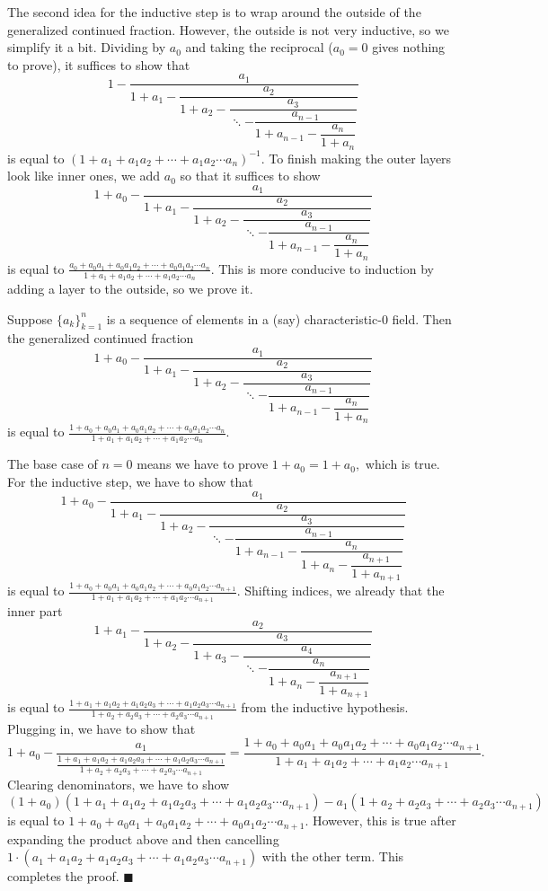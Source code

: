 The second idea for the inductive step is to wrap around the outside of the generalized continued fraction. However, the outside is not very inductive, so we simplify it a bit. Dividing by $a_0$ and taking the reciprocal ($a_0=0$ gives nothing to prove), it suffices to show that
\[1-\dfrac{a_1}{1+a_1-\dfrac{a_2}{1+a_2-\dfrac{a_3}{\ddots-\dfrac{a_{n-1}}{1+a_{n-1}-\dfrac{a_n}{1+a_n}}}}}\]
is equal to $(1+a_1+a_1a_2+\cdots+a_1a_2\cdots a_n)^{-1}.$ To finish making the outer layers look like inner ones, we add $a_0$ so that it suffices to show
\[1+a_0-\dfrac{a_1}{1+a_1-\dfrac{a_2}{1+a_2-\dfrac{a_3}{\ddots-\dfrac{a_{n-1}}{1+a_{n-1}-\dfrac{a_n}{1+a_n}}}}}\]
is equal to $\frac{a_0+a_0a_1+a_0a_1a_2+\cdots+a_0a_1a_2\cdots a_n}{1+a_1+a_1a_2+\cdots+a_1a_2\cdots a_n}.$ This is more conducive to induction by adding a layer to the outside, so we prove it.
\begin{lemma}
    Suppose $\{a_k\}_{k=1}^n$ is a sequence of elements in a (say) characteristic-$0$ field. Then the generalized continued fraction
    \[1+a_0-\dfrac{a_1}{1+a_1-\dfrac{a_2}{1+a_2-\dfrac{a_3}{\ddots-\dfrac{a_{n-1}}{1+a_{n-1}-\dfrac{a_n}{1+a_n}}}}}\]
    is equal to $\frac{1+a_0+a_0a_1+a_0a_1a_2+\cdots+a_0a_1a_2\cdots a_n}{1+a_1+a_1a_2+\cdots+a_1a_2\cdots a_n}.$
\end{lemma}
The base case of $n=0$ means we have to prove $1+a_0=1+a_0,$ which is true. For the inductive step, we have to show that
\[1+a_0-\dfrac{a_1}{1+a_1-\dfrac{a_2}{1+a_2-\dfrac{a_3}{\ddots-\dfrac{a_{n-1}}{1+a_{n-1}-\dfrac{a_n}{1+a_n-\dfrac{a_{n+1}}{1+a_{n+1}}}}}}}\]
is equal to $\frac{1+a_0+a_0a_1+a_0a_1a_2+\cdots+a_0a_1a_2\cdots a_{n+1}}{1+a_1+a_1a_2+\cdots+a_1a_2\cdots a_{n+1}}.$ Shifting indices, we already that the inner part
\[1+a_1-\dfrac{a_2}{1+a_2-\dfrac{a_3}{1+a_3-\dfrac{a_4}{\ddots-\dfrac{a_n}{1+a_n-\dfrac{a_{n+1}}{1+a_{n+1}}}}}}\]
is equal to $\frac{1+a_1+a_1a_2+a_1a_2a_3+\cdots+a_1a_2a_3\cdots a_{n+1}}{1+a_2+a_2a_3+\cdots+a_2a_3\cdots a_{n+1}}$ from the inductive hypothesis. Plugging in, we have to show that
\[1+a_0-\dfrac{a_1}{\frac{1+a_1+a_1a_2+a_1a_2a_3+\cdots+a_1a_2a_3\cdots a_{n+1}}{1+a_2+a_2a_3+\cdots+a_2a_3\cdots a_{n+1}}}=\frac{1+a_0+a_0a_1+a_0a_1a_2+\cdots+a_0a_1a_2\cdots a_{n+1}}{1+a_1+a_1a_2+\cdots+a_1a_2\cdots a_{n+1}}.\]
Clearing denominators, we have to show
\[(1+a_0)(1+a_1+a_1a_2+a_1a_2a_3+\cdots+a_1a_2a_3\cdots a_{n+1})-a_1(1+a_2+a_2a_3+\cdots+a_2a_3\cdots a_{n+1})\]
is equal to $1+a_0+a_0a_1+a_0a_1a_2+\cdots+a_0a_1a_2\cdots a_{n+1}.$ However, this is true after expanding the product above and then cancelling $1\cdot(a_1+a_1a_2+a_1a_2a_3+\cdots+a_1a_2a_3\cdots a_{n+1})$ with the other term. This completes the proof. $\blacksquare$

